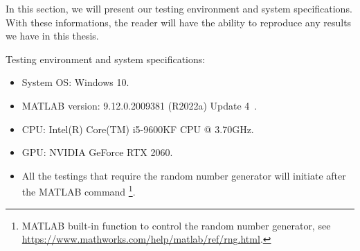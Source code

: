 In this section, we will present our testing environment and system
specifications. With these informations, the reader will have the ability
to reproduce any results we have in this thesis.

Testing environment and system specifications:
\begin{itemize}
\item System OS: Windows 10.
\item MATLAB version: 9.12.0.2009381 (R2022a) Update 4~\cite{MATLAB:2022}.
\item CPU: Intel(R) Core(TM) i5-9600KF CPU @ 3.70GHz.
\item GPU: NVIDIA GeForce RTX 2060.
\item All the testings that require the random number generator will
initiate after the MATLAB command \footnote{MATLAB
  built-in function to control the random number generator, see
  \url{https://www.mathworks.com/help/matlab/ref/rng.html}.}.
\end{itemize}

